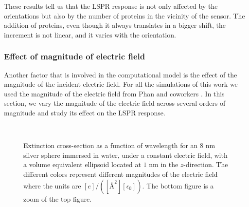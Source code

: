 These results tell us that the LSPR response is not only affected by the orientations but also by the number of proteins 
in the vicinity of the sensor. The addition of proteins, even though it always translates in a bigger shift, the increment  
is not linear, and it varies with the orientation. 

\subsubsection{Effect of magnitude of electric field}

Another factor that is involved in the computational model is the effect of the magnitude 
of the incident electric field. For all the simulations of this work we used the magnitude of the electric field from Phan and 
coworkers \cite{PhanETal2013}. In this section, we vary the magnitude of the electric field across several orders of magnitude 
and study its effect on the LSPR response. 

\begin{figure}%
    \centering
    \\
    \caption{Extinction cross-section as a function of wavelength for an $8$ nm
    silver sphere immersed in water, under a constant electric field, with a volume equivalent ellipsoid
    located at $1$ nm in the $z$-direction. The different colors represent different magnitudes of the 
    electric field where the units are $[e]/([{\text{\AA}}^2][\epsilon_0])$. The bottom figure is a zoom of the top 
    figure.}
    \label{fig:efield_effect}
 \end{figure}

